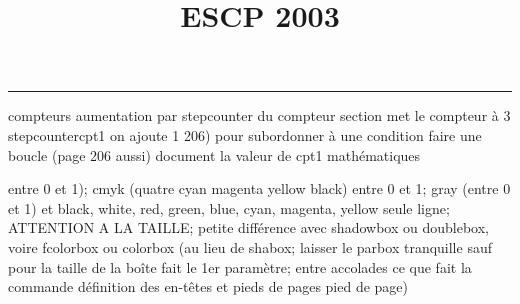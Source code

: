 \documentclass[11pt]{article}%
\title{\bf \vspace{-2cm} ESCP 2003} %
\author{} %
\date{} %
\renewcommand{\headrulewidth}{0pt}%
\renewcommand{\footrulewidth}{0.4pt}%
\begin{document}
\maketitle %
\vspace{-1.4cm}\hrule %
\thispagestyle{fancy}

\vspace*{.2cm}



compteurs%
aumentation par stepcounter du compteur section%
met le compteur à 3%
stepcounter{cpt1} on ajoute 1%
206) pour subordonner à une condition %
faire une boucle (page 206 aussi) %
document la valeur de cpt1 
mathématiques\newcommand{\ch}{\operatorname{ch}} 
\newcommand{\sh}{\operatorname{sh}}
\renewcommand{\tanh}{\operatorname{th}}
\renewcommand{\sinh}{\operatorname{sh}}
\renewcommand{\cosh}{\operatorname{ch}}
\newcommand{\argsh}{\operatorname{argsh}}
\newcommand{\argch}{\operatorname{argch}}
\newcommand{\argth}{\operatorname{argth}}
\newcommand{\ker}{\operatorname{Ker}}
\renewcommand{\im}{\operatorname{Im}}
\newcommand{\rg}{\operatorname{rg}}
\newcommand{\Id}{\operatorname{Id}}
\newcommand{\id}{\operatorname{id}}
\renewcommand{\leq}{\leq}
\renewcommand{\geq}{\geq }

entre 0 et 1); cmyk (quatre cyan magenta yellow black) entre 0 et 1;
gray (entre 0 et 1) et black, white, red, green, blue, cyan, magenta,
yellow%
seule ligne; ATTENTION A LA TAILLE; petite différence avec shadowbox ou
doublebox, voire fcolorbox ou colorbox (au lieu de shabox; laisser le
parbox tranquille sauf pour la taille de la boîte
\newcommand{\Tbox}[1]{\begin{center} \shabox{\parbox{0.6
\linewidth}{#1}} \end{center}} %
fait le 1er paramètre; entre accolades ce que fait la commande
définition des en-têtes et pieds de pages\pagestyle{fancy}
\chead{}
\rfoot[ \ \thepage]{\thepage}
\cfoot{}
\lfoot{}
\thispagestyle{fancy} %
pied de page)\renewcommand{\footrulewidth}{0.4pt}
\renewcommand{\headrulewidth}{0.4pt}
\end{document}
